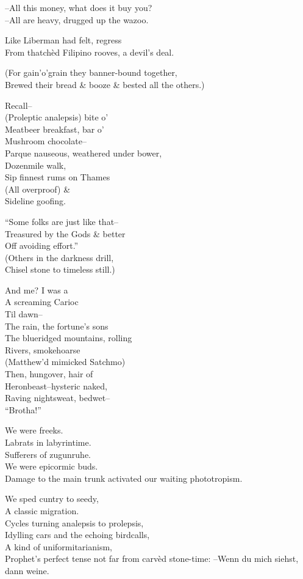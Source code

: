 --All this money, what does it buy you? \\
--All are heavy, drugged up the wazoo.

Like Liberman had felt, regress \\
From thatchèd Filipino rooves, a devil's deal.

(For gain'o'grain they banner-bound together, \\
Brewed their bread \& booze \& bested all the others.)

Recall-- \\
(Proleptic analepsis) bite o' \\
Meatbeer breakfast, bar o' \\
Mushroom chocolate-- \\
Parque nauseous, weathered under bower, \\
Dozenmile walk, \\
Sip finnest rums on Thames \\
(All overproof) \& \\
Sideline goofing.

``Some folks are just like that-- \\
Treasured by the Gods \& better \\
Off avoiding effort.'' \\
(Others in the darkness drill, \\
Chisel stone to timeless still.)

And me? I was a \\
A screaming Carioc \\
Til dawn-- \\
The rain, the fortune's sons \\
The blueridged mountains, rolling \\
Rivers, smokehoarse \\
(Matthew'd mimicked Satchmo) \\
Then, hungover, hair of \\
Heronbeast--hysteric naked, \\
Raving nightsweat, bedwet-- \\
``Brotha!''

We were freeks. \\
Labrats in labyrintime. \\
Sufferers of zugunruhe. \\
We were epicormic buds. \\
Damage to the main trunk activated our waiting phototropism.

We sped cuntry to seedy, \\
A classic migration. \\
Cycles turning analepsis to prolepsis, \\
Idylling cars and the echoing birdcalls, \\
A kind of uniformitarianism,\\
Prophet's perfect tense not far from carvèd stone-time:
--Wenn du mich siehst, dann weine. \\

